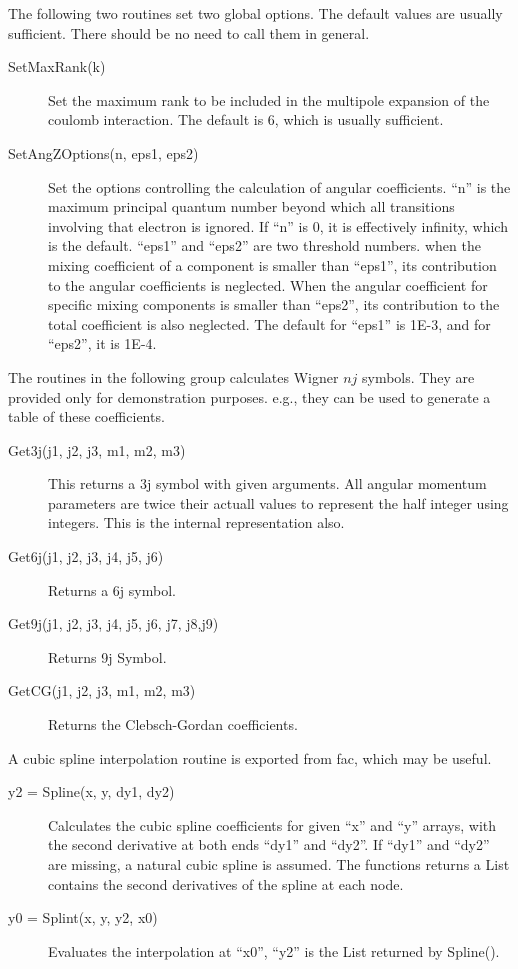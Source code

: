 \documentclass[12pt]{article}
\begin{document}
The following two routines set two global options. The default values are
usually sufficient. There should be no need to call them in general. 
\begin{description}
\item[SetMaxRank(k)] 
Set the maximum rank to be included in the multipole
expansion of the coulomb interaction. The default is 6, which is usually
sufficient. 

\item[SetAngZOptions(n, eps1, eps2)] 
Set the options controlling the
calculation of angular coefficients. ``n'' is the maximum principal quantum
number beyond which all transitions involving that electron is ignored. If
``n'' is 0, it is effectively infinity, which is the default. 
``eps1'' and ``eps2'' are two threshold numbers. when
the mixing coefficient of a component is smaller than ``eps1'', its
contribution to the angular coefficients is neglected. When the angular
coefficient for specific mixing components is smaller than ``eps2'', its
contribution to the total coefficient is also neglected. The default for
``eps1'' is 1E-3, and for ``eps2'', it is 1E-4. 

\end{description}

The routines in the following group calculates Wigner $nj$ symbols. They are
provided only for demonstration purposes. e.g., they can be used to generate a
table of these coefficients.
\begin{description}
\item[Get3j(j1, j2, j3, m1, m2, m3)] This returns a 3j symbol with given
arguments. All angular momentum parameters are twice their actuall values to
represent the half integer using integers. This is the internal
representation also. 

\item[Get6j(j1, j2, j3, j4, j5, j6)] Returns a 6j symbol.

\item[Get9j(j1, j2, j3, j4, j5, j6, j7, j8,j9)] Returns 9j Symbol.

\item[GetCG(j1, j2, j3, m1, m2, m3)] Returns the Clebsch-Gordan coefficients.

\end{description}

A cubic spline interpolation routine is exported from fac, which may be
useful. 
\begin{description}
\item[y2 = Spline(x, y, dy1, dy2)]
Calculates the cubic spline coefficients for given ``x'' and ``y'' arrays,
with the second derivative at both ends ``dy1'' and ``dy2''. If ``dy1'' and
``dy2'' are missing, a natural cubic spline is assumed. The functions returns
a List contains the second derivatives of the spline at each node.

\item[y0 = Splint(x, y, y2, x0)] 
Evaluates the interpolation at ``x0'', ``y2'' is the List returned by
Spline(). 
\end{description}
\end{document}
